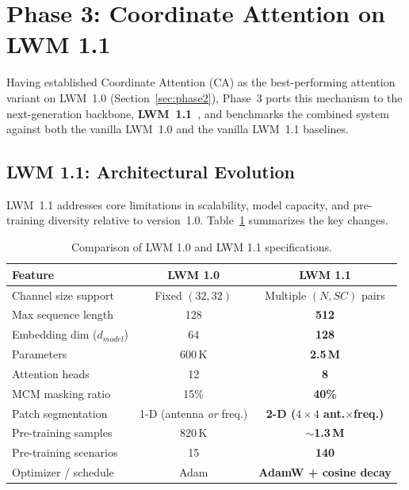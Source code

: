 \documentclass[12pt,a4paper]{article}
\begin{document}
\section{Phase 3: Coordinate Attention on LWM 1.1}\label{sec:phase3}

Having established Coordinate Attention (CA) as the best-performing attention variant on LWM~1.0 (Section~\ref{sec:phase2}), Phase~3 ports this mechanism to the next-generation backbone, \textbf{LWM~1.1}~\cite{lwm11}, and benchmarks the combined system against both the vanilla LWM~1.0 and the vanilla LWM~1.1 baselines.

\subsection{LWM 1.1: Architectural Evolution}\label{subsec:improvements_p3}

LWM~1.1 addresses core limitations in scalability, model capacity, and pre-training diversity relative to version~1.0. Table~\ref{tab:lwm_comp} summarizes the key changes.

\begin{table}[H]
\centering
\caption{Comparison of LWM 1.0 and LWM 1.1 specifications.}
\label{tab:lwm_comp}
\begin{tabular}{@{}lcc@{}}
\toprule
\textbf{Feature} & \textbf{LWM 1.0} & \textbf{LWM 1.1} \\
\midrule
Channel size support     & Fixed $(32, 32)$       & Multiple $(N, SC)$ pairs \\
Max sequence length      & 128                    & \textbf{512} \\
Embedding dim ($d_{model}$) & 64                 & \textbf{128} \\
Parameters               & 600\,K                 & \textbf{2.5\,M} \\
Attention heads           & 12                     & \textbf{8} \\
MCM masking ratio        & 15\%                   & \textbf{40\%} \\
Patch segmentation       & 1-D (antenna \emph{or} freq.) & \textbf{2-D ($4{\times}4$ ant.${\times}$freq.)} \\
Pre-training samples     & 820\,K                 & \textbf{$\sim$1.3\,M} \\
Pre-training scenarios   & 15                     & \textbf{140} \\
Optimizer / schedule     & Adam                   & \textbf{AdamW + cosine decay} \\
\bottomrule
\end{tabular}
\end{table}
\end{document}
